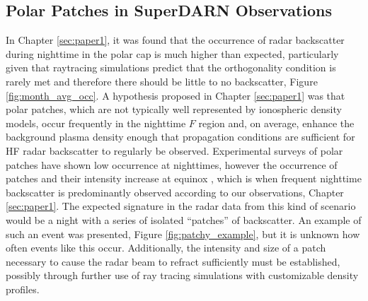\subsection{Polar Patches in SuperDARN Observations}
\label{sec:fw_patches}
In Chapter \ref{sec:paper1}, it was found that the occurrence of radar backscatter during nighttime in the polar cap is much higher than expected, particularly given that raytracing simulations predict that the orthogonality condition is rarely met and therefore there should be little to no backscatter, Figure \ref{fig:month_avg_occ}.  A hypothesis proposed in Chapter \ref{sec:paper1} was that polar patches, which are not typically well represented by ionospheric density models, occur frequently in the nighttime \(F\) region and, on average, enhance the background plasma density enough that propagation conditions are sufficient for HF radar backscatter to regularly be observed.  Experimental surveys of polar patches have shown low occurrence at nighttimes, however the occurrence of patches and their intensity increase at equinox \citep{Rodger1996}, which is when frequent nighttime backscatter is predominantly observed according to our observations, Chapter \ref{sec:paper1}.  The expected signature in the radar data from this kind of scenario would be a night with a series of isolated ``patches'' of backscatter.  An example of such an event was presented, Figure \ref{fig:patchy_example}, but it is unknown how often events like this occur.  Additionally, the intensity and size of a patch necessary to cause the radar beam to refract sufficiently must be established, possibly through further use of ray tracing simulations with customizable density profiles.

